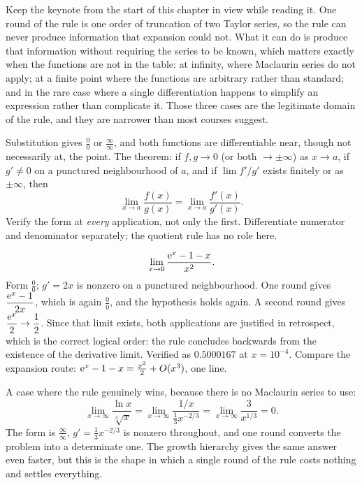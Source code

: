 Keep the keynote from the start of this chapter in view while reading it. One round of the rule is one order of truncation of two Taylor series, so the rule can never produce information that expansion could not. What it can do is produce that information without requiring the series to be known, which matters exactly when the functions are not in the table: at infinity, where Maclaurin series do not apply; at a finite point where the functions are arbitrary rather than standard; and in the rare case where a single differentiation happens to simplify an expression rather than complicate it. Those three cases are the legitimate domain of the rule, and they are narrower than most courses suggest.

\cue Substitution gives $\tfrac00$ or $\tfrac{\infty}{\infty}$, and both functions are differentiable near, though not necessarily at, the point.
\method The theorem: if $f,g\to0$ (or both $\to\pm\infty$) as $x\to a$, if $g'\neq0$ on a punctured neighbourhood of $a$, and if $\lim f'/g'$ exists finitely or as $\pm\infty$, then
\[
\lim_{x\to a}\frac{f(x)}{g(x)}=\lim_{x\to a}\frac{f'(x)}{g'(x)}.
\]
Verify the form at \emph{every} application, not only the first. Differentiate numerator and denominator separately; the quotient rule has no role here.

\begin{worked}
\[
\lim_{x\to0}\frac{\mathrm{e}^{x}-1-x}{x^{2}}.
\]
Form $\tfrac00$; $g'=2x$ is nonzero on a punctured neighbourhood. One round gives $\dfrac{\mathrm{e}^{x}-1}{2x}$, which is again $\tfrac00$, and the hypothesis holds again. A second round gives $\dfrac{\mathrm{e}^{x}}{2}\to\dfrac12$. Since that limit exists, both applications are justified in retrospect, which is the correct logical order: the rule concludes backwards from the existence of the derivative limit. Verified as $0.5000167$ at $x=10^{-4}$. Compare the expansion route: $\mathrm{e}^{x}-1-x=\tfrac{x^{2}}{2}+O(x^{3})$, one line.

A case where the rule genuinely wins, because there is no Maclaurin series to use:
\[
\lim_{x\to\infty}\frac{\ln x}{\sqrt[3]{x}}
=\lim_{x\to\infty}\frac{1/x}{\tfrac13x^{-2/3}}
=\lim_{x\to\infty}\frac{3}{x^{1/3}}=0 .
\]
The form is $\tfrac{\infty}{\infty}$, $g'=\tfrac13x^{-2/3}$ is nonzero throughout, and one round converts the problem into a determinate one. The growth hierarchy gives the same answer even faster, but this is the shape in which a single round of the rule costs nothing and settles everything.
\end{worked}

